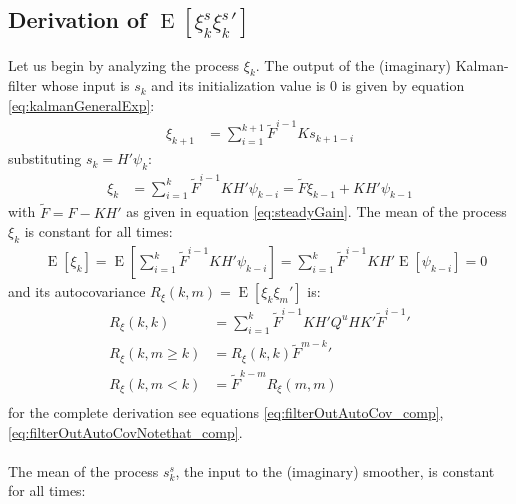 \documentclass[oneside,12pt]{article}
\begin{document}
\subsection*{Derivation of $\operatorname{E}[\xi^s_{k}\xi^s_{k}']$}
%
Let us begin by analyzing the process $\xi_k$. The output of the (imaginary) Kalman-filter whose input is $s_k$ and its initialization value is $0$ is given by equation \ref{eq:kalmanGeneralExp}:
%
\begin{equation}
    \begin{split}
        \xi_{k+1} &= \sum_{i=1}^{k+1} \tilde{F}^{i-1} K s_{k+1-i}
    \end{split}
\end{equation}
%
substituting $s_{k} = H' \psi_{k}$:
%
\begin{equation}\label{eq:kalmanUnmodeledOutput}
    \begin{split}
        \xi_{k} &= \sum_{i=1}^{k} \tilde{F}^{i-1} K H' \psi_{k-i} = \tilde{F}\xi_{k-1} + KH' \psi_{k-1}
    \end{split}
\end{equation}
%
with $\tilde{F} = F - K H'$ as given in equation \ref{eq:steadyGain}. The mean of the process $\xi_k$ is constant for all times:
%
\begin{equation}\label{eq:filterOutMean}
    \begin{split}
        &\operatorname{E}[\xi_k] = \operatorname{E}[\sum_{i=1}^{k} \tilde{F}^{i-1} K H' \psi_{k-i}] = \sum_{i=1}^{k} \tilde{F}^{i-1} K H' \operatorname{E}[ \psi_{k-i}] = 0
    \end{split}
\end{equation}        
%
and its autocovariance $R_{\xi}(k,m) = \operatorname{E}[\xi_k \xi_m']$ is:
%
\begin{equation}\label{eq:filterOutAutoCovNotethat}
    \begin{split}
        R_{\xi}(k,k) &= \sum_{i=1}^{k} \tilde{F}^{i-1} K H' Q^u H K' \tilde{F}^{i-1}'\\
        R_{\xi}(k,m \geq k) &= R_{\xi}(k,k) \tilde{F}^{m-k}'\\
        R_{\xi}(k,m<k) &= \tilde{F}^{k-m} R_{\xi}(m,m)\\
    \end{split}
\end{equation}
%
for the complete derivation see equations \ref{eq:filterOutAutoCov_comp}, \ref{eq:filterOutAutoCovNotethat_comp}.\\\\
%
The mean of the process $s^s_k$, the input to the (imaginary) smoother, is constant for all times:
\end{document}
